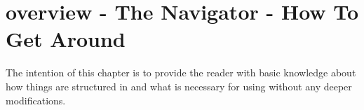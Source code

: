 \chapter[\Dumux overview - The \Dumux Navigator - How To Get Around]{\Dumux overview - The \Dumux Navigator - How To Get Around}

The intention of this chapter is to provide the reader with basic knowledge
about how things are structured in \Dumux and what is necessary for
using \Dumux without any deeper modifications.









